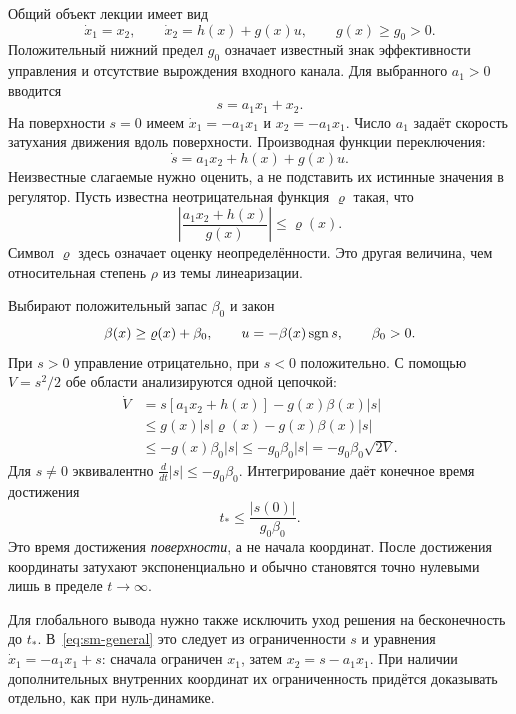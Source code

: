 Общий объект лекции имеет вид
\begin{equation}
 \dot x_1=x_2,\qquad
 \dot x_2=h(x)+g(x)u,\qquad g(x)\ge g_0>0.
 \label{eq:sm-general}
\end{equation}
Положительный нижний предел $g_0$ означает известный знак эффективности
управления и отсутствие вырождения входного канала. Для выбранного
$a_1>0$ вводится
\[
 s=a_1x_1+x_2.
\]
На поверхности $s=0$ имеем $\dot x_1=-a_1x_1$ и $x_2=-a_1x_1$.
Число $a_1$ задаёт скорость затухания движения вдоль поверхности.
Производная функции переключения:
\[
 \dot s=a_1x_2+h(x)+g(x)u.
\]
Неизвестные слагаемые нужно оценить, а не подставить их истинные значения
в регулятор. Пусть известна неотрицательная функция $\varrho$ такая, что
\begin{equation}
 \left|\frac{a_1x_2+h(x)}{g(x)}\right|\le\varrho(x).
 \label{eq:sm-rho}
\end{equation}
Символ $\varrho$ здесь означает оценку неопределённости. Это другая величина,
чем относительная степень $\rho$ из темы линеаризации.

Выбирают положительный запас $\beta_0$ и закон
\begin{equation}
 \beta(x)\ge\varrho(x)+\beta_0,\qquad
 u=-\beta(x)\operatorname{sgn} s,\qquad \beta_0>0.
 \label{eq:sm-law}
\end{equation}
При $s>0$ управление отрицательно, при $s<0$ положительно. С помощью
$V=s^2/2$ обе области анализируются одной цепочкой:
\begin{align*}
 \dot V&=s[a_1x_2+h(x)]-g(x)\beta(x)|s|\\
 &\le g(x)|s|\varrho(x)-g(x)\beta(x)|s|\\
 &\le-g(x)\beta_0|s|\le-g_0\beta_0|s|
 =-g_0\beta_0\sqrt{2V}.
\end{align*}
Для $s\ne0$ эквивалентно $\frac{d}{dt}|s|\le-g_0\beta_0$.
Интегрирование даёт конечное время достижения
\begin{equation}
 t_*\le\frac{|s(0)|}{g_0\beta_0}.
 \label{eq:sm-time}
\end{equation}
Это время достижения \emph{поверхности}, а не начала координат.
После достижения координаты затухают экспоненциально и обычно становятся
точно нулевыми лишь в пределе $t\to\infty$.

\addition Для глобального вывода нужно также исключить уход решения на
бесконечность до $t_*$. В~\eqref{eq:sm-general} это следует из ограниченности
$s$ и уравнения $\dot x_1=-a_1x_1+s$: сначала ограничен $x_1$, затем
$x_2=s-a_1x_1$. При наличии дополнительных внутренних координат их
ограниченность придётся доказывать отдельно, как при нуль-динамике.


